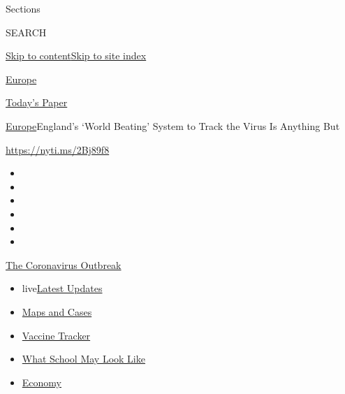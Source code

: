 Sections

SEARCH

\protect\hyperlink{site-content}{Skip to
content}\protect\hyperlink{site-index}{Skip to site index}

\href{https://www.nytimes.com/section/world/europe}{Europe}

\href{https://myaccount.nytimes.com/auth/login?response_type=cookie\&client_id=vi}{}

\href{https://www.nytimes.com/section/todayspaper}{Today's Paper}

\href{/section/world/europe}{Europe}\textbar{}England's `World Beating'
System to Track the Virus Is Anything But

\url{https://nyti.ms/2Bj89f8}

\begin{itemize}
\item
\item
\item
\item
\item
\item
\end{itemize}

\href{https://www.nytimes.com/news-event/coronavirus?action=click\&pgtype=Article\&state=default\&region=TOP_BANNER\&context=storylines_menu}{The
Coronavirus Outbreak}

\begin{itemize}
\tightlist
\item
  live\href{https://www.nytimes.com/2020/08/01/world/coronavirus-covid-19.html?action=click\&pgtype=Article\&state=default\&region=TOP_BANNER\&context=storylines_menu}{Latest
  Updates}
\item
  \href{https://www.nytimes.com/interactive/2020/us/coronavirus-us-cases.html?action=click\&pgtype=Article\&state=default\&region=TOP_BANNER\&context=storylines_menu}{Maps
  and Cases}
\item
  \href{https://www.nytimes.com/interactive/2020/science/coronavirus-vaccine-tracker.html?action=click\&pgtype=Article\&state=default\&region=TOP_BANNER\&context=storylines_menu}{Vaccine
  Tracker}
\item
  \href{https://www.nytimes.com/interactive/2020/07/29/us/schools-reopening-coronavirus.html?action=click\&pgtype=Article\&state=default\&region=TOP_BANNER\&context=storylines_menu}{What
  School May Look Like}
\item
  \href{https://www.nytimes.com/live/2020/07/31/business/stock-market-today-coronavirus?action=click\&pgtype=Article\&state=default\&region=TOP_BANNER\&context=storylines_menu}{Economy}
\end{itemize}

